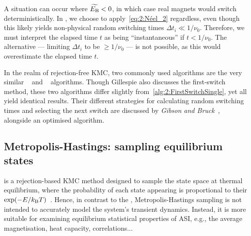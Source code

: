 A situation can occur where $\widetilde{E_\mathrm{B}} < 0$, in which case real magnets would switch deterministically.
In \hotspice, we choose to apply~\cref{eq:2:Néel_2} regardless, even though this likely yields non-physical random switching times $\Delta t_i \ll 1/\nu_0$.
Therefore, we must interpret the elapsed time $t$ as being ``instantaneous'' if $t < 1/\nu_0$.
The alternative --- limiting $\Delta t_i$ to be $\geq 1/\nu_0$ --- is not possible, as this would overestimate the elapsed time $t$. \par
In the realm of rejection-free KMC, two commonly used algorithms are the very similar ~\cite{nfoldMCalgorithm} and ~\cite{gillespie1976general} algorithms.
Though Gillespie also discusses the first-switch method, these two algorithms differ slightly from~\cref{alg:2:FirstSwitchSingle}, yet all yield identical results.
Their different strategies for calculating random switching times and selecting the next switch are discussed by \textit{Gibson and Bruck}~\cite{GibsonBruck}, alongside an optimised algorithm.

\subsection{Metropolis-Hastings: sampling equilibrium states}\label{sec:2:Dynamics_MH}
 is a rejection-based KMC method designed to sample the state space at thermal equilibrium, where the probability of each state appearing is proportional to their  $\exp(-E/\kBT)$~\cite{IntroductionMC,kyimba2006comparisonIsingAlgorithms}.
Hence, in contrast to the , Metropolis-Hastings sampling is not intended to accurately model the system's transient dynamics.
Instead, it is more suitable for examining equilibrium statistical properties of ASI, e.g., the average magnetisation, heat capacity, correlations...~\cite{ApparentFMpinwheel} \par

